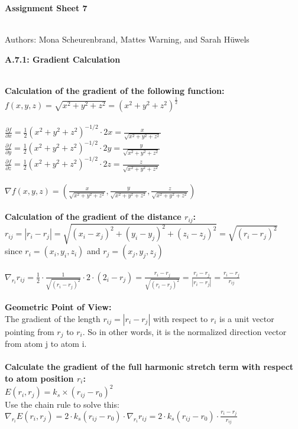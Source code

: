 \documentclass[a4paper,10pt]{article}
\begin{document}


\begin{huge}
	\vspace{1cm}
	\textbf{Assignment Sheet 7}
\end{huge} \\

Authors: Mona Scheurenbrand, Mattes Warning, and Sarah Hüwels


\begin{large}
	\vspace{1.0cm}
	\textbf{A.7.1: Gradient Calculation}
\end{large}	\\ [2mm]
\textbf{Calculation of the gradient of the following function:} \\
$f(x,y,z) = \sqrt{x^2 + y^2 + z^2} = (x^2 + y^2 + z^2)^\frac{1}{2}$ \\
\\
$\frac{\partial f}{\partial x} = \frac{1}{2}(x^2 + y^2 + z^2)^{-1/2} \cdot 2x = \frac{x}{\sqrt{x^2 + y^2 + z^2}}$ \\
$\frac{\partial f}{\partial y} = \frac{1}{2}(x^2 + y^2 + z^2)^{-1/2} \cdot 2y = \frac{y}{\sqrt{x^2 + y^2 + z^2}}$ \\
$\frac{\partial f}{\partial z} = \frac{1}{2}(x^2 + y^2 + z^2)^{-1/2} \cdot 2z = \frac{z}{\sqrt{x^2 + y^2 + z^2}}$ \\ 
\\
$\nabla f(x,y,z) = (\frac{x}{\sqrt{x^2 + y^2 + z^2}}, \frac{y}{\sqrt{x^2 + y^2 + z^2}}, \frac{z}{\sqrt{x^2 + y^2 + z^2}})$ \\
\\
\textbf{Calculation of the gradient of the distance $r_{ij}$:} \\
$r_{ij} = |r_i-r_j| = \sqrt{(x_i-x_j)^2 + (y_i-y_j)^2 + (z_i-z_j)^2} = \sqrt{(r_i-r_j)^2}$ \\
since $r_i = (x_i,y_i,z_i)$ and $r_j = (x_j,y_j,z_j)$ \\
\\ 
$\nabla_{r_i}r_{ij} = \frac{1}{2} \cdot \frac{1}{\sqrt{(r_i-r_j)^2}} \cdot 2 \cdot (2_i - r_j) = \frac{r_i - r_j}{\sqrt{(r_i-r_j)^2}} = \frac{r_i - r_j}{|r_i - r_j|} = \frac{r_i - r_j}{r_{ij}}$ \\
\\
\textbf{Geometric Point of View:} \\ 
The gradient of the length $r_{ij} = |r_i - r_j|$ with respect to $r_i$ is a unit vector pointing from $r_j$ to $r_i$. So in  other words, it is the normalized direction vector from atom j to atom i. \\
\\
\textbf{Calculate the gradient of the full harmonic stretch term with respect to atom position $r_i$:} \\ 
$E(r_i, r_j) = k_s \times (r_{ij} - r_0)^2$ \\
Use the chain rule to solve this: \\
$\nabla_{r_i} E(r_i, r_j) = 2 \cdot k_s (r_{ij} - r_0) \cdot \nabla_{r_i}r_{ij} = 2 \cdot k_s (r_{ij} - r_0) \cdot \frac{r_i - r_j}{r_{ij}}$
\end{document}
